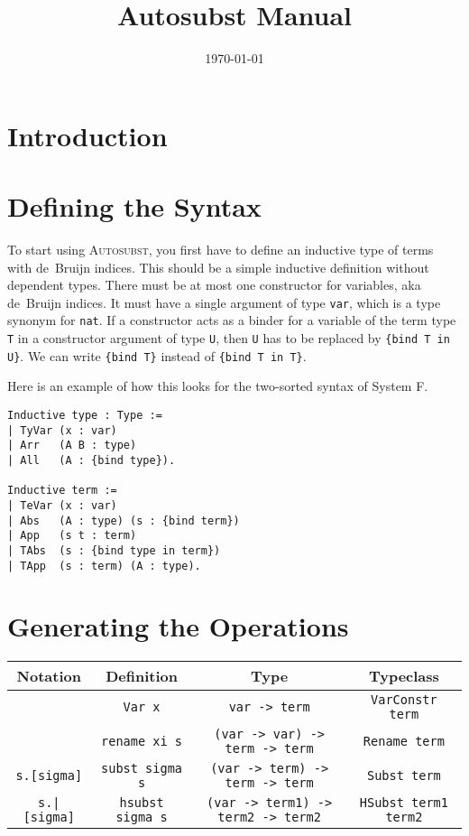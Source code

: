 \documentclass{scrartcl}
\newcommand{\Autosubst}{\textsc{Autosubst}\xspace}
\newcommand{\lst}{\lstinline}
\begin{document}
\title{Autosubst Manual}
\date{\today}
\maketitle

\section{Introduction}
\label{sec:introduction}

\section{Defining the Syntax}
\label{sec:defining-syntax}

To start using \Autosubst, you first have to define an inductive type of terms with de~Bruijn indices.
This should be a simple inductive definition without dependent types.
There must be at most one constructor for variables, aka de~Bruijn indices. It must have a single argument of type \lst$var$, which is a type synonym for \lst$nat$.
If a constructor acts as a binder for a variable of the term type \lst$T$ in a constructor argument of type \lst$U$, then \lst$U$ has to be replaced by \lst${bind T in U}$.
We can write \lst${bind T}$ instead of \lst${bind T in T}$.

Here is an example of how this looks for the two-sorted syntax of System F.

\begin{lstlisting}
Inductive type : Type :=
| TyVar (x : var)
| Arr   (A B : type)
| All   (A : {bind type}).

Inductive term :=
| TeVar (x : var)
| Abs   (A : type) (s : {bind term})
| App   (s t : term)
| TAbs  (s : {bind type in term})
| TApp  (s : term) (A : type).
\end{lstlisting}

\section{Generating the Operations}
\label{sec:gener-oper}

\begin{tabular}{c c c c}
  Notation & Definition & Type & Typeclass \\\hline\noalign{\vspace{0.5em}}

                   & \lst$Var x$          & \lst$var -> term$ & \lst$VarConstr term$ \\
                   & \lst$rename xi s$    & \lst$(var -> var) -> term -> term$ & \lst$Rename term$ \\
  \lst$s.[sigma]$  & \lst$subst sigma s$  & \lst$(var -> term) -> term -> term$ & \lst$Subst term$ \\
  \lst$s.|[sigma]$ & \lst$hsubst sigma s$ & \lst$(var -> term1) -> term2 -> term2$ & \lst$HSubst term1 term2$
\end{tabular}
\end{document}
